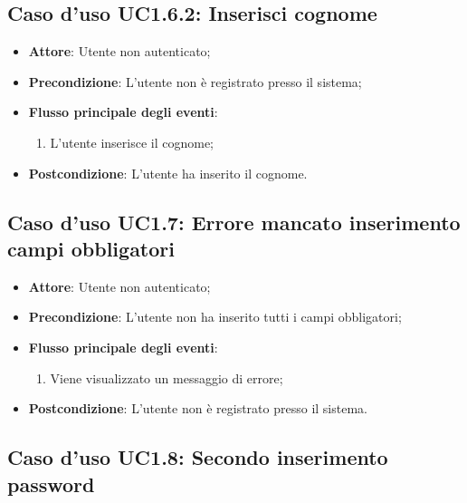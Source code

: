\documentclass[12pt,a4paper]{article}
\begin{document}
\subsection{Caso d'uso UC1.6.2: Inserisci cognome}

\begin{itemize}

\item \textbf{Attore}: Utente non autenticato; 
\item \textbf{Precondizione}: L'utente non è registrato presso il sistema;

\item \textbf{Flusso principale degli eventi}:
\begin{enumerate}
	\item L'utente inserisce il cognome;
	
\end{enumerate}
\item \textbf{Postcondizione}: L'utente ha inserito il cognome.
\end{itemize}
\hypertarget{UC1.7}{}
\subsection{Caso d'uso UC1.7: Errore mancato inserimento campi obbligatori}

\begin{itemize}

\item \textbf{Attore}: Utente non autenticato; 
\item \textbf{Precondizione}: L'utente non ha inserito tutti i campi obbligatori;

\item \textbf{Flusso principale degli eventi}:
\begin{enumerate}
	\item Viene visualizzato un messaggio di errore;
	
\end{enumerate}
\item \textbf{Postcondizione}: L'utente non è registrato presso il sistema.
\end{itemize}
\hypertarget{UC1.8}{}
\subsection{Caso d'uso UC1.8: Secondo inserimento password}
\end{document}
